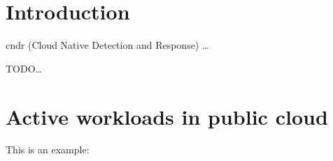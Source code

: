 \section{Introduction}

\gls{cndr} (Cloud Native Detection and Response)
\dots
\begin{cautionblock}
TODO\dots
\end{cautionblock} 

\section{Active workloads in public cloud}

This is an example:\


